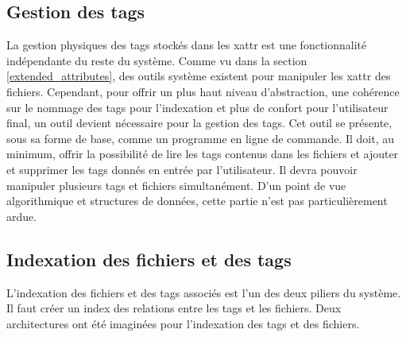 \documentclass[a4paper, 12pt]{article}
\begin{document}
\subsection{Gestion des tags}
La gestion physiques des tags stockés dans les \acrshort{xattr} est une fonctionnalité indépendante du 
reste du système. Comme vu dans la section \ref{extended_attributes}, des outils système existent pour 
manipuler les \acrshort{xattr} des fichiers. Cependant, pour offrir un plus haut niveau d'abstraction, 
une cohérence sur le nommage des tags pour l'indexation et plus de confort pour l'utilisateur final, 
un outil devient nécessaire pour la gestion des tags. Cet outil se présente, sous sa forme de base, 
comme un programme en ligne de commande. Il doit, au minimum, offrir la possibilité de lire les tags 
contenus dans les fichiers et ajouter et supprimer les tags donnés en entrée par l'utilisateur. 
Il devra pouvoir manipuler plusieurs tags et fichiers simultanément. D'un point de vue algorithmique 
et structures de données, cette partie n'est pas particulièrement ardue.

\subsection{Indexation des fichiers et des tags}
L'indexation des fichiers et des tags associés est l'un des deux piliers du système. Il faut créer 
un index des relations entre les tags et les fichiers. Deux architectures ont été imaginées pour 
l'indexation des tags et des fichiers.
\end{document}
